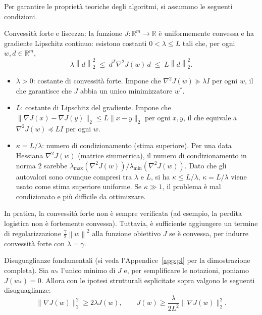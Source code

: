\documentclass[a4paper,12pt]{article}
\newcommand{\R}{\mathbb{R}}
\newcommand{\norm}[1]{\left\|#1\right\|}
\begin{document}
Per garantire le propriet\`a teoriche degli algoritmi, si assumono le seguenti condizioni.

\begin{definitionbox}
  Convessit\`a forte e liscezza: la funzione $J: \R^m \to \R$ \`e uniformemente convessa e ha gradiente Lipschitz continuo: esistono costanti $0 < \lambda \leq L$ tali che, per ogni $w, d \in \R^m$,
  \[
    \lambda \norm{d}_2^2 \;\leq\; d^T \nabla^2 J(w)\, d \;\leq\; L \norm{d}_2^2.
  \]
  \begin{itemize}
    \item $\lambda > 0$: costante di convessità forte. Impone che $\nabla^2 J(w) \succeq \lambda I$ per ogni $w$, il che garantisce che $J$ abbia un unico minimizzatore $w^*$.
    \item $L$: costante di Lipschitz del gradiente. Impone che $\|\nabla J(x) - \nabla J(y)\|_2 \leq L\|x - y\|_2$ per ogni $x,y$, il che equivale a $\nabla^2 J(w) \preceq LI$ per ogni $w$.
    \item $\kappa = L/\lambda$: numero di condizionamento (stima superiore). Per una data Hessiana $\nabla^2 J(w)$ (matrice simmetrica), il numero di condizionamento in norma 2 sarebbe $\lambda_{\max}(\nabla^2 J(w))/\lambda_{\min}(\nabla^2 J(w))$. Dato che gli autovalori sono ovunque compresi tra $\lambda$ e $L$, si ha $\kappa \leq L/\lambda$, $\kappa = L/\lambda$ viene usato come stima superiore uniforme. Se $\kappa \gg 1$, il problema è mal condizionato e più difficile da ottimizzare.
\end{itemize}
  

  
\end{definitionbox}

\begin{notebox}
  In pratica, la convessit\`a forte non \`e sempre verificata (ad esempio, la perdita logistica non \`e fortemente convessa). Tuttavia, \`e sufficiente aggiungere un termine di regolarizzazione $\frac{\gamma}{2}\norm{w}^2$ alla funzione obiettivo $J$ se è convessa, per indurre convessit\`a forte con $\lambda = \gamma$.
\end{notebox}
\begin{notebox}
  Disuguaglianze fondamentali (si veda l'Appendice~\ref{app:pl} per la dimostrazione completa).
  Sia $w_*$ l'unico minimo di $J$ e, per semplificare le notazioni, poniamo $J(w_*) = 0$. Allora con le ipotesi strutturali esplicitate sopra valgono le seguenti disuguaglianze:
  \[
  \|\nabla J(w)\|_2^2 \geq 2\lambda J(w), \qquad J(w) \geq \frac{\lambda}{2L^2} \|\nabla J(w)\|_2^2.
  \]
\end{notebox}
\newpage
\end{document}
